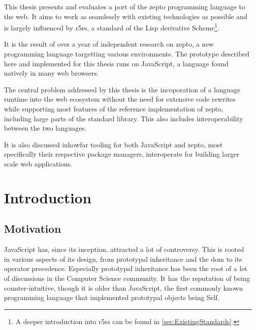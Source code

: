 \documentclass[oneside,11pt,xetex]{scrbook}
\begin{document}

This thesis presents and evaluates a port of the zepto programming language to the web. It aims to
work as seamlessly with existing technologies as possible and is largely influenced by \gls{r5rs},
a standard of the Lisp derivative Scheme\footnote{A deeper introduction into \gls{r5rs} can be found
in \ref{sec:ExistingStandards}.}.

It is the result of over a year of independent research on zepto, a new programming language
targetting various environments. The prototype described here and implemented for this
thesis runs on JavaScript, a language found natively in many web browsers.

The central problem addressed by this thesis is the incoporation of a language runtime
into the web ecosystem without the need for extensive code rewrites while supporting
most features of the reference implementation of zepto, including large parts of the
standard library. This also includes interoperability between the two languages.

It is also discussed inhowfar tooling for both JavaScript and zepto, most specifically
their respective package managers, interoperate for building larger scale web applications.

\tableofcontents

\printglossary[type=\acronymtype,title=Abbreviations]

\mainmatter

\pagestyle{headings}

\chapter{Introduction}
\label{chap:intro}

\section{Motivation}
\label{sec:Motivation}

JavaScript has, since its inception, attracted a lot of controversy. This is rooted
in various aspects of its design, from prototypal inheritance and the \gls{dom} to
its operator precedence. Especially prototypal inheritance  has been the root
of a lot of discussions in the Computer Science community. It has the reputation of
being counter-intuitive, though it is older than JavaScript, the first commonly known
programming language that implemented prototypal objects being Self.
\end{document}
